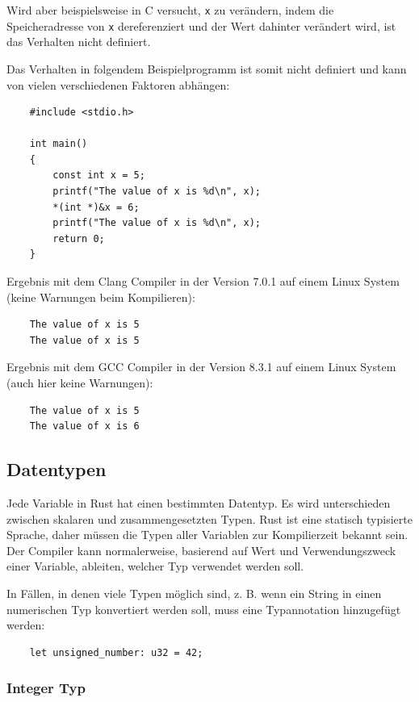 Wird aber beispielsweise in C versucht, \verb"x" zu verändern, indem die Speicheradresse von \verb"x" dereferenziert und der Wert dahinter verändert wird, ist das Verhalten nicht definiert. \cite[p.~87]{ISO:9899:2017}

Das Verhalten in folgendem Beispielprogramm ist somit nicht definiert und kann von vielen verschiedenen Faktoren abhängen:

\begin{lstlisting}
    #include <stdio.h>

    int main()
    {
        const int x = 5;
        printf("The value of x is %d\n", x);
        *(int *)&x = 6;
        printf("The value of x is %d\n", x);
        return 0;
    }
\end{lstlisting}

Ergebnis mit dem Clang Compiler in der Version 7.0.1 auf einem Linux System (keine Warnungen beim Kompilieren):

\begin{lstlisting}
    The value of x is 5
    The value of x is 5
\end{lstlisting}

Ergebnis mit dem GCC Compiler in der Version 8.3.1 auf einem Linux System (auch hier keine Warnungen):

\begin{lstlisting}
    The value of x is 5
    The value of x is 6
\end{lstlisting}

\subsection{Datentypen}\label{chap:datatypes}

Jede Variable in Rust hat einen bestimmten Datentyp. Es wird unterschieden zwi\-schen skalaren und zusammengesetzten Typen. Rust ist eine statisch typisierte Sprache, daher müssen die Typen aller Variablen zur Kompilierzeit bekannt sein. Der Compiler kann normalerweise, basierend auf Wert und Verwendungszweck einer Variable, ableiten, welcher Typ verwendet werden soll.

In Fällen, in denen viele Typen möglich sind, z. B. wenn ein String in einen numerischen Typ konvertiert werden soll, muss eine Typannotation hinzugefügt werden:

\begin{lstlisting}
    let unsigned_number: u32 = 42;
\end{lstlisting}

\subsubsection{Integer Typ}


